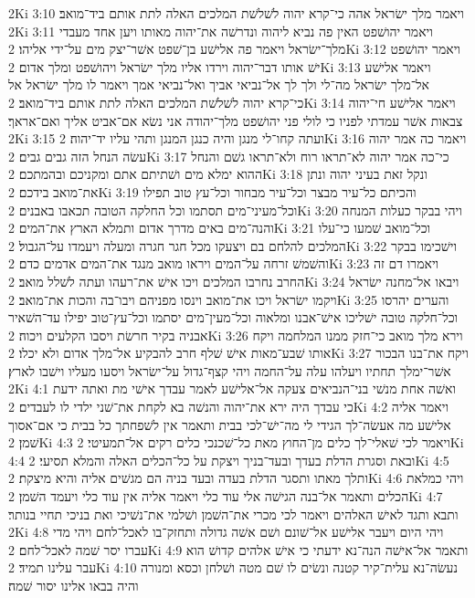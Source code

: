 2Ki 3:10  ויאמר מלך ישׂראל אהה כי־קרא יהוה לשׁלשׁת המלכים האלה לתת אותם ביד־מואב׃
2Ki 3:11  ויאמר יהושׁפט האין פה נביא ליהוה ונדרשׁה את־יהוה מאותו ויען אחד מעבדי מלך־ישׂראל ויאמר פה אלישׁע בן־שׁפט אשׁר־יצק מים על־ידי אליהו׃
2Ki 3:12  ויאמר יהושׁפט ישׁ אותו דבר־יהוה וירדו אליו מלך ישׂראל ויהושׁפט ומלך אדום׃
2Ki 3:13  ויאמר אלישׁע אל־מלך ישׂראל מה־לי ולך לך אל־נביאי אביך ואל־נביאי אמך ויאמר לו מלך ישׂראל אל כי־קרא יהוה לשׁלשׁת המלכים האלה לתת אותם ביד־מואב׃
2Ki 3:14  ויאמר אלישׁע חי־יהוה צבאות אשׁר עמדתי לפניו כי לולי פני יהושׁפט מלך־יהודה אני נשׂא אם־אביט אליך ואם־אראך׃
2Ki 3:15  ועתה קחו־לי מנגן והיה כנגן המנגן ותהי עליו יד־יהוה׃
2Ki 3:16  ויאמר כה אמר יהוה עשׂה הנחל הזה גבים גבים׃
2Ki 3:17  כי־כה אמר יהוה לא־תראו רוח ולא־תראו גשׁם והנחל ההוא ימלא מים ושׁתיתם אתם ומקניכם ובהמתכם׃
2Ki 3:18  ונקל זאת בעיני יהוה ונתן את־מואב בידכם׃
2Ki 3:19  והכיתם כל־עיר מבצר וכל־עיר מבחור וכל־עץ טוב תפילו וכל־מעיני־מים תסתמו וכל החלקה הטובה תכאבו באבנים׃
2Ki 3:20  ויהי בבקר כעלות המנחה והנה־מים באים מדרך אדום ותמלא הארץ את־המים׃
2Ki 3:21  וכל־מואב שׁמעו כי־עלו המלכים להלחם בם ויצעקו מכל חגר חגרה ומעלה ויעמדו על־הגבול׃
2Ki 3:22  וישׁכימו בבקר והשׁמשׁ זרחה על־המים ויראו מואב מנגד את־המים אדמים כדם׃
2Ki 3:23  ויאמרו דם זה החרב נחרבו המלכים ויכו אישׁ את־רעהו ועתה לשׁלל מואב׃
2Ki 3:24  ויבאו אל־מחנה ישׂראל ויקמו ישׂראל ויכו את־מואב וינסו מפניהם ויבו־בה והכות את־מואב׃
2Ki 3:25  והערים יהרסו וכל־חלקה טובה ישׁליכו אישׁ־אבנו ומלאוה וכל־מעין־מים יסתמו וכל־עץ־טוב יפילו עד־השׁאיר אבניה בקיר חרשׂת ויסבו הקלעים ויכוה׃
2Ki 3:26  וירא מלך מואב כי־חזק ממנו המלחמה ויקח אותו שׁבע־מאות אישׁ שׁלף חרב להבקיע אל־מלך אדום ולא יכלו׃
2Ki 3:27  ויקח את־בנו הבכור אשׁר־ימלך תחתיו ויעלהו עלה על־החמה ויהי קצף־גדול על־ישׂראל ויסעו מעליו וישׁבו לארץ׃
2Ki 4:1  ואשׁה אחת מנשׁי בני־הנביאים צעקה אל־אלישׁע לאמר עבדך אישׁי מת ואתה ידעת כי עבדך היה ירא את־יהוה והנשׁה בא לקחת את־שׁני ילדי לו לעבדים׃
2Ki 4:2  ויאמר אליה אלישׁע מה אעשׂה־לך הגידי לי מה־ישׁ־לכי בבית ותאמר אין לשׁפחתך כל בבית כי אם־אסוך שׁמן׃
2Ki 4:3  ויאמר לכי שׁאלי־לך כלים מן־החוץ מאת כל־שׁכנכי כלים רקים אל־תמעיטי׃
2Ki 4:4  ובאת וסגרת הדלת בעדך ובעד־בניך ויצקת על כל־הכלים האלה והמלא תסיעי׃
2Ki 4:5  ותלך מאתו ותסגר הדלת בעדה ובעד בניה הם מגשׁים אליה והיא מיצקת׃
2Ki 4:6  ויהי כמלאת הכלים ותאמר אל־בנה הגישׁה אלי עוד כלי ויאמר אליה אין עוד כלי ויעמד השׁמן׃
2Ki 4:7  ותבא ותגד לאישׁ האלהים ויאמר לכי מכרי את־השׁמן ושׁלמי את־נשׁיכי ואת בניכי תחיי בנותר׃
2Ki 4:8  ויהי היום ויעבר אלישׁע אל־שׁונם ושׁם אשׁה גדולה ותחזק־בו לאכל־לחם ויהי מדי עברו יסר שׁמה לאכל־לחם׃
2Ki 4:9  ותאמר אל־אישׁה הנה־נא ידעתי כי אישׁ אלהים קדושׁ הוא עבר עלינו תמיד׃
2Ki 4:10  נעשׂה־נא עלית־קיר קטנה ונשׂים לו שׁם מטה ושׁלחן וכסא ומנורה והיה בבאו אלינו יסור שׁמה׃
